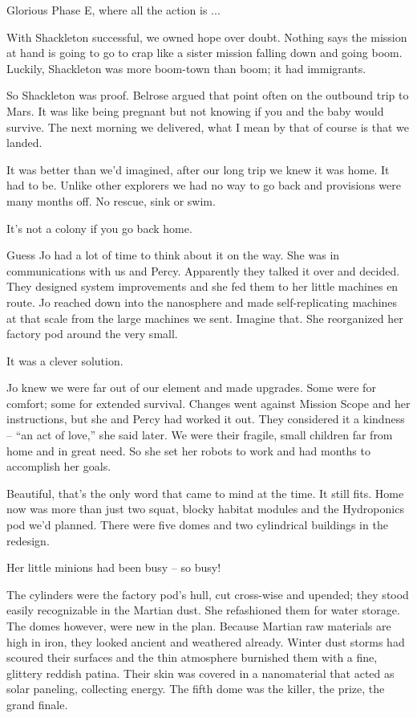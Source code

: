 \documentclass[11pt,a4paper]{article}
\newcommand{\storybreak}{%
  \par\vspace{0.6\baselineskip}
  \begin{center}\color{storyblue}\small *\enspace *\enspace *\end{center}
  \vspace{0.3\baselineskip}\noindent\ignorespaces
}
\begin{document}
Glorious Phase E, where all the action is ...

With Shackleton successful, we owned hope over doubt. Nothing says the mission at hand is going to go to crap like a sister mission falling down and going boom. Luckily, Shackleton was more boom-town than boom; it had immigrants.

So Shackleton was proof. Belrose argued that point often on the outbound trip to Mars. It was like being pregnant but not knowing if you and the baby would survive. The next morning we delivered, what I mean by that of course is that we landed.

\storybreak

It was better than we’d imagined, after our long trip we knew it was home. It had to be. Unlike other explorers we had no way to go back and provisions were many months off. No rescue, sink or swim.

It’s not a colony if you go back home.

Guess Jo had a lot of time to think about it on the way. She was in communications with us and Percy. Apparently they talked it over and decided. They designed system improvements and she fed them to her little machines en route. Jo reached down into the nanosphere and made self-replicating machines at that scale from the large machines we sent. Imagine that. She reorganized her factory pod around the very small.

It was a clever solution.

Jo knew we were far out of our element and made upgrades. Some were for comfort; some for extended survival. Changes went against Mission Scope and her instructions, but she and Percy had worked it out. They considered it a kindness – “an act of love,” she said later. We were their fragile, small children far from home and in great need. So she set her robots to work and had months to accomplish her goals.

Beautiful, that’s the only word that came to mind at the time. It still fits. Home now was more than just two squat, blocky habitat modules and the Hydroponics pod we’d planned. There were five domes and two cylindrical buildings in the redesign.

Her little minions had been busy – so busy!

The cylinders were the factory pod’s hull, cut cross-wise and upended; they stood easily recognizable in the Martian dust. She refashioned them for water storage. The domes however, were new in the plan. Because Martian raw materials are high in iron, they looked ancient and weathered already. Winter dust storms had scoured their surfaces and the thin atmosphere burnished them with a fine, glittery reddish patina. Their skin was covered in a nanomaterial that acted as solar paneling, collecting energy. The fifth dome was the killer, the prize, the grand finale.
\end{document}
